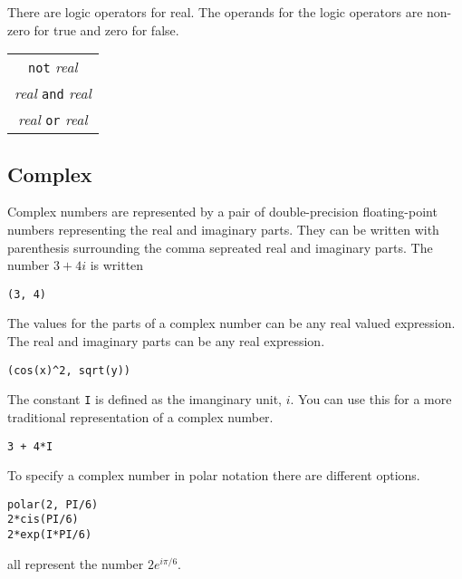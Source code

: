 \documentclass{article}
\begin{document}
There are logic operators for real. The operands for the logic operators are non-zero for true and zero for false.
\begin{center}
  \begin{tabular}{c}
    \verb|not| \emph{real} \\
    \emph{real} \verb|and| \emph{real} \\
    \emph{real} \verb|or| \emph{real} \\
  \end{tabular}
\end{center}

\subsection{Complex}
Complex numbers are represented by a pair of double-precision floating-point numbers representing the
real and imaginary parts.
They can be written with parenthesis surrounding the comma sepreated real and imaginary parts.
The number $3 + 4i$ is written
\begin{verbatim}
(3, 4)
\end{verbatim}
The values for the parts of a complex number can be any real valued
expression.
The real and imaginary parts can be any real expression.
\begin{verbatim}
(cos(x)^2, sqrt(y))
\end{verbatim}
The constant \verb|I| is defined as the imanginary unit, $i$. You can use this for a more traditional
representation of a complex number.
\begin{verbatim}
3 + 4*I
\end{verbatim}

To specify a complex number in polar notation there are different options.
\begin{verbatim}
polar(2, PI/6)
2*cis(PI/6)
2*exp(I*PI/6)
\end{verbatim}
all represent the number $2e^{i \pi/6}$.
\end{document}
